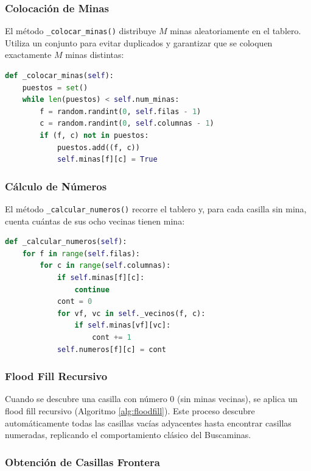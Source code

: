 \documentclass[12pt,a4paper]{article}
\begin{document}
\subsubsection{Colocación de Minas}

El método \texttt{\_colocar\_minas()} distribuye $M$ minas aleatoriamente en el tablero. Utiliza un conjunto para evitar duplicados y garantizar que se coloquen exactamente $M$ minas distintas:

\begin{lstlisting}[language=Python, caption={Colocación de minas aleatorias.}]
def _colocar_minas(self):
    puestos = set()
    while len(puestos) < self.num_minas:
        f = random.randint(0, self.filas - 1)
        c = random.randint(0, self.columnas - 1)
        if (f, c) not in puestos:
            puestos.add((f, c))
            self.minas[f][c] = True
\end{lstlisting}

\subsubsection{Cálculo de Números}

El método \texttt{\_calcular\_numeros()} recorre el tablero y, para cada casilla sin mina, cuenta cuántas de sus ocho vecinas tienen mina:

\begin{lstlisting}[language=Python, caption={Cálculo de números para cada casilla.}]
def _calcular_numeros(self):
    for f in range(self.filas):
        for c in range(self.columnas):
            if self.minas[f][c]:
                continue
            cont = 0
            for vf, vc in self._vecinos(f, c):
                if self.minas[vf][vc]:
                    cont += 1
            self.numeros[f][c] = cont
\end{lstlisting}

\subsubsection{Flood Fill Recursivo}

Cuando se descubre una casilla con número 0 (sin minas vecinas), se aplica un flood fill recursivo (Algoritmo \ref{alg:floodfill}). Este proceso descubre automáticamente todas las casillas vacías adyacentes hasta encontrar casillas numeradas, replicando el comportamiento clásico del Buscaminas.

\subsubsection{Obtención de Casillas Frontera}
\end{document}
